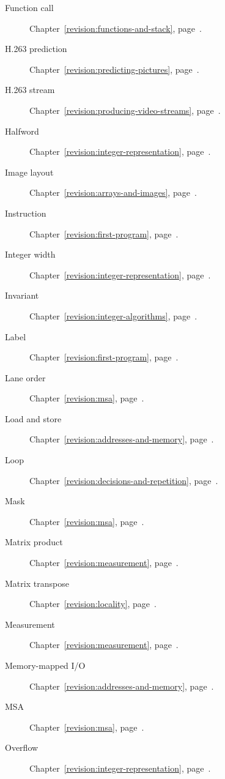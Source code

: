 \begin{description}
  \item[Function call] Chapter~\ref{revision:functions-and-stack}, page~\pageref{revision:functions-and-stack}.
  \item[H.263 prediction] Chapter~\ref{revision:predicting-pictures}, page~\pageref{revision:predicting-pictures}.
  \item[H.263 stream] Chapter~\ref{revision:producing-video-streams}, page~\pageref{revision:producing-video-streams}.
  \item[Halfword] Chapter~\ref{revision:integer-representation}, page~\pageref{revision:integer-representation}.
  \item[Image layout] Chapter~\ref{revision:arrays-and-images}, page~\pageref{revision:arrays-and-images}.
  \item[Instruction] Chapter~\ref{revision:first-program}, page~\pageref{revision:first-program}.
  \item[Integer width] Chapter~\ref{revision:integer-representation}, page~\pageref{revision:integer-representation}.
  \item[Invariant] Chapter~\ref{revision:integer-algorithms}, page~\pageref{revision:integer-algorithms}.
  \item[Label] Chapter~\ref{revision:first-program}, page~\pageref{revision:first-program}.
  \item[Lane order] Chapter~\ref{revision:msa}, page~\pageref{revision:msa}.
  \item[Load and store] Chapter~\ref{revision:addresses-and-memory}, page~\pageref{revision:addresses-and-memory}.
  \item[Loop] Chapter~\ref{revision:decisions-and-repetition}, page~\pageref{revision:decisions-and-repetition}.
  \item[Mask] Chapter~\ref{revision:msa}, page~\pageref{revision:msa}.
  \item[Matrix product] Chapter~\ref{revision:measurement}, page~\pageref{revision:measurement}.
  \item[Matrix transpose] Chapter~\ref{revision:locality}, page~\pageref{revision:locality}.
  \item[Measurement] Chapter~\ref{revision:measurement}, page~\pageref{revision:measurement}.
  \item[Memory-mapped I/O] Chapter~\ref{revision:addresses-and-memory}, page~\pageref{revision:addresses-and-memory}.
  \item[MSA] Chapter~\ref{revision:msa}, page~\pageref{revision:msa}.
  \item[Overflow] Chapter~\ref{revision:integer-representation}, page~\pageref{revision:integer-representation}.

\end{description}
